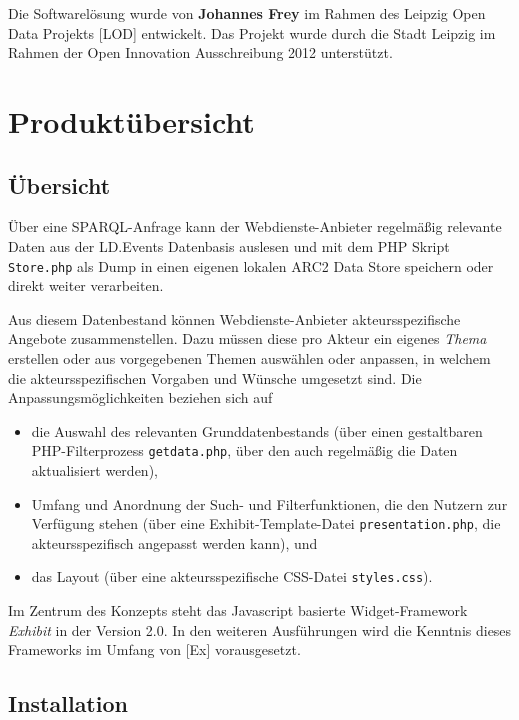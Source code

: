 \documentclass[11pt,a4paper]{article}
\begin{document}
Die Softwarelösung wurde von \textbf{Johannes Frey} im Rahmen des Leipzig Open
Data Projekts [LOD] entwickelt. Das Projekt wurde durch die Stadt Leipzig im
Rahmen der Open Innovation Ausschreibung 2012 unterstützt.

\section{Produktübersicht}

\subsection{Übersicht}

Über eine SPARQL-Anfrage kann der Webdienste-Anbieter regelmäßig relevante
Daten aus der LD.Events Datenbasis auslesen und mit dem PHP Skript
\texttt{Store.php} als Dump in einen eigenen lokalen ARC2 Data Store
speichern oder direkt weiter verarbeiten. 

Aus diesem Datenbestand können Webdienste-Anbieter akteursspezifische Angebote
zusammenstellen.  Dazu müssen diese pro Akteur ein eigenes \emph{Thema}
erstellen oder aus vorgegebenen Themen auswählen oder anpassen, in welchem die
akteursspezifischen Vorgaben und Wünsche umgesetzt sind.  Die
Anpassungsmöglichkeiten beziehen sich auf
\begin{itemize}
\item die Auswahl des relevanten Grunddatenbestands (über einen gestaltbaren
  PHP-Filter\-prozess \texttt{getdata.php}, über den auch regelmäßig die Daten
  aktualisiert werden),
\item Umfang und Anordnung der Such- und Filterfunktionen, die den Nutzern zur
  Verfügung stehen (über eine Exhibit-Template-Datei
  \texttt{presentation.php}, die akteursspezifisch angepasst werden kann), und
\item das Layout (über eine akteursspezifische CSS-Datei \texttt{styles.css}). 
\end{itemize}
Im Zentrum des Konzepts steht das Javascript basierte Widget-Framework
\emph{Exhibit} in der Version 2.0. In den weiteren Ausführungen wird die
Kenntnis dieses Frameworks im Umfang von [Ex] vorausgesetzt.

\subsection{Installation}
\end{document}

